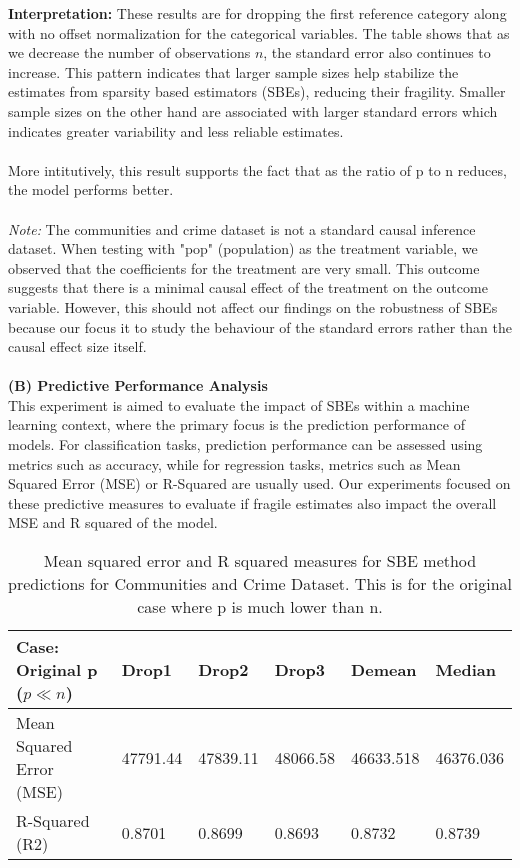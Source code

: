 \textbf{Interpretation:} These results are for dropping the first reference category along with no offset normalization for the categorical variables. The table shows that as we decrease the number of observations $n$, the standard error also continues to increase. This pattern indicates that larger sample sizes help stabilize the estimates from sparsity based estimators (SBEs), reducing their fragility. Smaller sample sizes on the other hand are associated with larger standard errors which indicates greater variability and less reliable estimates. \\
\\
More intitutively, this result supports the fact that as the ratio of p to n reduces, the model performs better.\\
\\
\textit{Note:} The communities and crime dataset is not a standard causal inference dataset. When testing with "pop" (population) as the treatment variable, we observed that the coefficients for the treatment are very small. This outcome suggests that there is a minimal causal effect of the treatment on the outcome variable. However, this should not affect our findings on the robustness of SBEs because our focus it to study the behaviour of the standard errors rather than the causal effect size itself.\\
\\
\textbf{(B) Predictive Performance Analysis }\\
This experiment is aimed to evaluate the impact of SBEs within a machine learning context, where the primary focus is the prediction performance of models. For classification tasks, prediction performance can be assessed using metrics such as accuracy, while for regression tasks, metrics such as Mean Squared Error (MSE) or R-Squared are usually used. Our experiments focused on these predictive measures to evaluate if fragile estimates also impact the overall MSE and R squared of the model.
\begin{table}[h!]
\renewcommand{\arraystretch}{1.5}
\centering
\begin{tabular}{||l l l l l l||} 
 \hline
 \hline
 Case: Original p ($p \ll n$) & Drop1 & Drop2 & Drop3 & Demean & Median \\ [0.5ex] 
 \hline \hline
 Mean Squared Error (MSE) & 47791.44 & 47839.11 & 48066.58 & 46633.518 & 46376.036 \\ 
 R-Squared (R2) & 0.8701 & 0.8699 & 0.8693 & 0.8732 & 0.8739 \\
 \hline \hline
\end{tabular}
\caption{Mean squared error and R squared measures for SBE method predictions for Communities and Crime Dataset. This is for the original case where p is much lower than n.}
\label{table:1}
\end{table}


